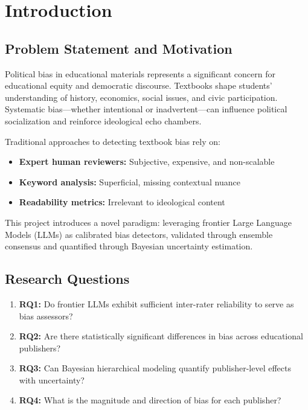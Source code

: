 \documentclass[11pt,a4paper]{article}
\begin{document}
\section{Introduction}

\subsection{Problem Statement and Motivation}

Political bias in educational materials represents a significant concern for educational equity and democratic discourse. Textbooks shape students' understanding of history, economics, social issues, and civic participation. Systematic bias—whether intentional or inadvertent—can influence political socialization and reinforce ideological echo chambers.

Traditional approaches to detecting textbook bias rely on:
\begin{itemize}
    \item \textbf{Expert human reviewers:} Subjective, expensive, and non-scalable
    \item \textbf{Keyword analysis:} Superficial, missing contextual nuance
    \item \textbf{Readability metrics:} Irrelevant to ideological content
\end{itemize}

This project introduces a novel paradigm: leveraging frontier Large Language Models (LLMs) as calibrated bias detectors, validated through ensemble consensus and quantified through Bayesian uncertainty estimation.

\subsection{Research Questions}

\begin{enumerate}
    \item \textbf{RQ1:} Do frontier LLMs exhibit sufficient inter-rater reliability to serve as bias assessors?
    \item \textbf{RQ2:} Are there statistically significant differences in bias across educational publishers?
    \item \textbf{RQ3:} Can Bayesian hierarchical modeling quantify publisher-level effects with uncertainty?
    \item \textbf{RQ4:} What is the magnitude and direction of bias for each publisher?
\end{enumerate}
\end{document}
